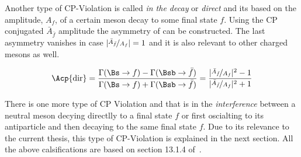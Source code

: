 Another type of CP-Violation is called {\it in the decay} or {\it direct} and its based on the amplitude, $A_f$, of a certain meson decay to some final state $f$.
Using the CP conjugated $\bar{A}_{\bar{f}}$ amplitude the asymmetry of  can be constructed.
The last asymmetry vanishes in case $|\nicefrac{\bar{A}_{\bar{f}}}{A_f}| = 1$  and it is also relevant to other charged mesons as well.

\begin{equation}
\Acp{\text{dir}} = \frac{\Gamma(\Bs \rightarrow f) - \Gamma(\Bsb \rightarrow \bar{f})} {\Gamma(\Bs \rightarrow f) + \Gamma(\Bsb \rightarrow \bar{f})}
                 = \frac{ |\nicefrac{\bar{A}_{\bar{f}}}{A_f}|^2 - 1}{|\nicefrac{\bar{A}_{\bar{f}}}{A_f}|^2 + 1}
\label{cpv_decay}
\end{equation}


There is one more type of CP Violation and that is in the {\it interference} between
a neutral meson decying directlly to a final state $f$ or first oscialting to its antiparticle and then decaying
to the same final state $f$. Due to its relevance to the current thesis, this type of CP-Violation is explained
in the next section. All the above calsifications are based on section 13.1.4 of~\cite{PDG}.
